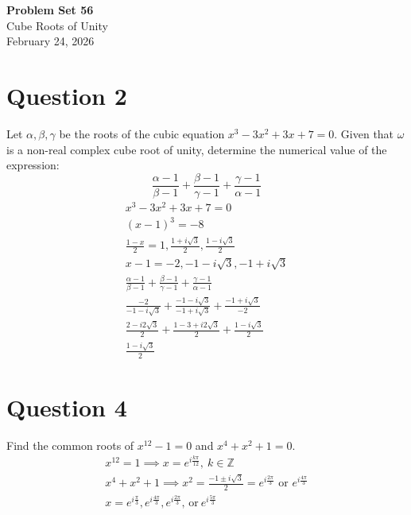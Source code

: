 \documentclass[12pt]{article}
\begin{document}
\vspace*{0cm}

\begin{center}
    {\Large \bfseries Problem Set 56} \\[0.5cm]
    {\large Cube Roots of Unity} \\[0.35cm]
    {\normalsize February 24, 2026}
\end{center}


\section{Question 2}
Let $\alpha,\beta,\gamma$ be the roots of the cubic equation $x^3-3x^2+3x+7=0$. Given that $\omega$ is a non-real complex cube root of unity, determine the numerical value of the expression:
\[
\frac{\alpha -1}{\beta -1}+\frac{\beta -1}{\gamma -1}+\frac{\gamma -1}{\alpha -1}
\]
\begin{gather*}
    x^3-3x^2+3x+7=0\\
    (x-1)^3=-8\\
    \frac{1-x}{2}=1, \frac{1+i\sqrt3}{2}, \frac{1-i\sqrt3}{2}\\
    x-1=-2, -1-i\sqrt{3}, -1+i\sqrt{3}\\
    \frac{\alpha -1}{\beta -1}+\frac{\beta -1}{\gamma -1}+\frac{\gamma -1}{\alpha -1}\\
    \frac{-2}{-1-i\sqrt{3}}+\frac{-1-i\sqrt{3}}{-1+i\sqrt{3}}+\frac{-1+i\sqrt{3}}{-2}\\
    \frac{2-i2\sqrt{3}}{2}+\frac{1-3+i2\sqrt{3}}{2}+\frac{1-i\sqrt{3}}{2}\\
    \boxed{\frac{1-i\sqrt{3}}{2}}
\end{gather*}

\section{Question 4}
Find the common roots of $x^{12}-1=0$ and $x^4+x^2+1=0$.
\begin{gather*}
    x^{12}=1 \implies x=e^{i\frac{k\pi}{12}},\ k\in\mathbb{Z}\\
    x^4+x^2+1 \implies x^2=\frac{-1\pm i\sqrt{3}}{2}=e^{i\frac{2\pi}{3}} \text{ or } e^{i\frac{4\pi}{3}}\\
    \boxed{x=e^{i\frac{\pi}{3}},e^{i\frac{4\pi}{3}},e^{i\frac{2\pi}{3}}, \, \text{or}\  e^{i\frac{5\pi}{3}}}
\end{gather*}
\end{document}

